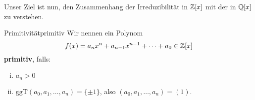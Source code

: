 Unser Ziel ist nun, den Zusammenhang der Irreduzibilität in $\mathbb{Z}[x]$ mit der in $\mathbb{Q}[x]$ zu verstehen.
\begin{definition}{Primitivität}{primitiv}
Wir nennen ein Polynom 
\begin{equation}
f(x) = a_nx^n+a_{n-1}x^{n-1} + \cdots + a_0 \in \mathbb{Z}[x]
\end{equation}
\textbf{primitiv}, falls:
\begin{enumerate}[(i)]
\item $a_n > 0$ 
\item $\text{ggT} (a_0, a_1, \dots, a_n) = \{\pm 1\}$, also $(a_0, a_1, \dots, a_n) = (1)$.
\end{enumerate}
\end{definition}